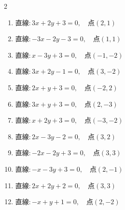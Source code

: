 \begin{multicols}{2}
\begin{enumerate}
  \item $直線:3x+2y+3=0,\quad 点 ( 2, 1 )$


  \item $直線:-3x-2y-3=0,\quad 点 ( 1, 1 )$


  \item $直線:x-3y+3=0,\quad 点 ( -1, -2 )$


  \item $直線:3x+2y-1=0,\quad 点 ( 3, -2 )$


  \item $直線:2x+y+3=0,\quad 点 ( -2, 2 )$


\columnbreak %

  \item $直線:3x+y+3=0,\quad 点 ( 2, -3 )$


  \item $直線:x+2y+3=0,\quad 点 ( -3, -2 )$


  \item $直線:2x-3y-2=0,\quad 点 ( 3, 2 )$


  \item $直線:-2x-2y+3=0,\quad 点 ( 3, 3 )$


  \item $直線:-x-3y+3=0,\quad 点 ( 2, -1 )$


  \item $直線:2x+2y+2=0,\quad 点 ( 3, 3 )$


  \item $直線:-x+y+1=0,\quad 点 ( 2, -2 )$


\end{enumerate}
\end{multicols}
